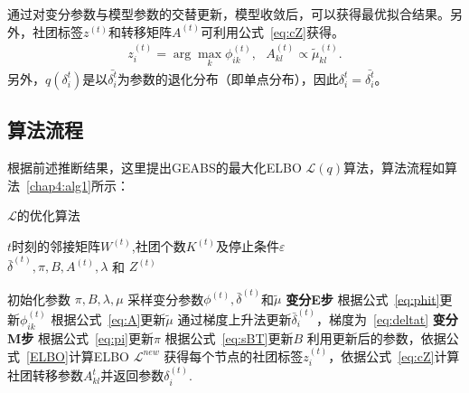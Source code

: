 通过对变分参数与模型参数的交替更新，模型收敛后，可以获得最优拟合结果。另外，社团标签$z^{(t)}$和转移矩阵$A^{(t)}$可利用公式~\ref{eq:cZ}获得。
\begin{equation}
\begin{split}
z^{(t)}_i = \arg \max_k \phi_{ik}^{(t)}, ~~~A_{kl}^{(t)} \propto \tilde{\mu}_{kl}^{(t)}.
\end{split}
\label{eq:cZ}
\end{equation}
另外，$q(\delta_i^t)$是以$\bar{\delta_i^t}$为参数的退化分布（即单点分布），因此$\delta_i^t = \bar{\delta_i^t}$。



\subsection{算法流程}
根据前述推断结果，这里提出GEABS的最大化ELBO $\mathscr{L}(q)$算法，算法流程如算法~\ref{chap4:alg1}所示：

\begin{algorithm}[H]
\caption{$\mathcal{L}$的优化算法}\label{chap4:alg1}
\algorithmicrequire \;$t$时刻的邻接矩阵$W^{(t)}$,社团个数$K^{(t)}$及停止条件$\varepsilon$\\
\algorithmicensure \;$\bar{\delta}^{(t)}, \pi, B, A^{(t)},\lambda$ 和 $Z^{(t)}$
\begin{algorithmic}[1]
\STATE 初始化参数 $\pi,B,\lambda, \mu$
\STATE 采样变分参数$\phi^{(t)},\bar{\delta}^{(t)}$和$\tilde{\mu}$
\REPEAT
    \STATE \textbf{变分E步}
    \STATE 根据公式~\ref{eq:phit}更新$\phi^{(t)}_{ik}$
    \STATE 根据公式~\ref{eq:A}更新$\tilde{\mu}$
     \STATE 通过梯度上升法更新$\bar{\delta}_i^{(t)}$，梯度为~\ref{eq:deltat}
    \STATE \textbf{变分M步}
    \STATE 根据公式~\ref{eq:pi}更新$\pi$
    \STATE 根据公式~\ref{eq:sBT}更新$B$
    \STATE 利用更新后的参数，依据公式~\ref{ELBO}计算ELBO $\mathcal{L}^{new}$
\ENDFOR
{}
\STATE 获得每个节点的社团标签$z^{(t)}_i$，依据公式~\ref{eq:cZ}计算社团转移参数$A_{kl}^t$并返回参数$\delta^{(t)}_i$.
\ENDFOR  
\end{algorithmic}
\end{algorithm}

